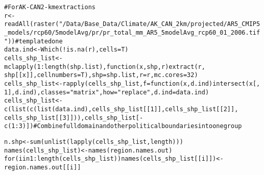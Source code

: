 \documentclass{article}\usepackage[]{graphicx}\usepackage[]{color}
\makeatletter
\newcommand{\hlnum}[1]{\textcolor[rgb]{0.863,0.196,0.184}{#1}}%
\newcommand{\hlstr}[1]{\textcolor[rgb]{0.863,0.196,0.184}{#1}}%
\newcommand{\hlcom}[1]{\textcolor[rgb]{0.345,0.431,0.459}{#1}}%
\newcommand{\hlopt}[1]{\textcolor[rgb]{0.576,0.631,0.631}{#1}}%
\newcommand{\hlstd}[1]{\textcolor[rgb]{0.514,0.58,0.588}{#1}}%
\newcommand{\hlkwa}[1]{\textcolor[rgb]{0.796,0.294,0.086}{#1}}%
\newcommand{\hlkwb}[1]{\textcolor[rgb]{0.522,0.6,0}{#1}}%
\newcommand{\hlkwc}[1]{\textcolor[rgb]{0.796,0.294,0.086}{#1}}%
\newcommand{\hlkwd}[1]{\textcolor[rgb]{0.576,0.631,0.631}{#1}}%
\newenvironment{kframe}{%
 \def\at@end@of@kframe{}%
 \ifinner\ifhmode%
  \def\at@end@of@kframe{\end{minipage}}%
  \begin{minipage}{\columnwidth}%
 \fi\fi%
 \def\FrameCommand##1{\hskip\@totalleftmargin \hskip-\fboxsep
 \colorbox{shadecolor}{##1}\hskip-\fboxsep
     \hskip-\linewidth \hskip-\@totalleftmargin \hskip\columnwidth}%
 \MakeFramed {\advance\hsize-\width
   \@totalleftmargin\z@ \linewidth\hsize
   \@setminipage}}%
 {\par\unskip\endMakeFramed%
 \at@end@of@kframe}
\newenvironment{knitrout}{}{} %
\makeatother
\begin{document}
\begin{knitrout}
\color{fgcolor}\begin{kframe}
\begin{alltt}
\hlcom{# For AK-CAN 2-km extractions}
\hlstd{r} \hlkwb{<-} \hlkwd{readAll}\hlstd{(}\hlkwd{raster}\hlstd{(}\hlstr{"/Data/Base_Data/Climate/AK_CAN_2km/projected/AR5_CMIP5_models/rcp60/5modelAvg/pr/pr_total_mm_AR5_5modelAvg_rcp60_01_2006.tif"}\hlstd{))}  \hlcom{# template done}
\hlstd{data.ind} \hlkwb{<-} \hlkwd{Which}\hlstd{(}\hlopt{!}\hlkwd{is.na}\hlstd{(r),} \hlkwc{cells} \hlstd{= T)}
\hlstd{cells_shp_list} \hlkwb{<-} \hlkwd{mclapply}\hlstd{(}\hlnum{1}\hlopt{:}\hlkwd{length}\hlstd{(shp.list),} \hlkwa{function}\hlstd{(}\hlkwc{x}\hlstd{,} \hlkwc{shp}\hlstd{,} \hlkwc{r}\hlstd{)} \hlkwd{extract}\hlstd{(r,}
    \hlstd{shp[[x]],} \hlkwc{cellnumbers} \hlstd{= T),} \hlkwc{shp} \hlstd{= shp.list,} \hlkwc{r} \hlstd{= r,} \hlkwc{mc.cores} \hlstd{=} \hlnum{32}\hlstd{)}
\hlstd{cells_shp_list} \hlkwb{<-} \hlkwd{rapply}\hlstd{(cells_shp_list,} \hlkwc{f} \hlstd{=} \hlkwa{function}\hlstd{(}\hlkwc{x}\hlstd{,} \hlkwc{d.ind}\hlstd{)} \hlkwd{intersect}\hlstd{(x[,}
    \hlnum{1}\hlstd{], d.ind),} \hlkwc{classes} \hlstd{=} \hlstr{"matrix"}\hlstd{,} \hlkwc{how} \hlstd{=} \hlstr{"replace"}\hlstd{,} \hlkwc{d.ind} \hlstd{= data.ind)}
\hlstd{cells_shp_list} \hlkwb{<-} \hlkwd{c}\hlstd{(}\hlkwd{list}\hlstd{(}\hlkwd{c}\hlstd{(}\hlkwd{list}\hlstd{(data.ind), cells_shp_list[[}\hlnum{1}\hlstd{]], cells_shp_list[[}\hlnum{2}\hlstd{]],}
    \hlstd{cells_shp_list[[}\hlnum{3}\hlstd{]])), cells_shp_list[}\hlopt{-}\hlkwd{c}\hlstd{(}\hlnum{1}\hlopt{:}\hlnum{3}\hlstd{)])}  \hlcom{# Combine full domain and other political boundaries into one group}

\hlstd{n.shp} \hlkwb{<-} \hlkwd{sum}\hlstd{(}\hlkwd{unlist}\hlstd{(}\hlkwd{lapply}\hlstd{(cells_shp_list, length)))}
\hlkwd{names}\hlstd{(cells_shp_list)} \hlkwb{<-} \hlkwd{names}\hlstd{(region.names.out)}
\hlkwa{for} \hlstd{(i} \hlkwa{in} \hlnum{1}\hlopt{:}\hlkwd{length}\hlstd{(cells_shp_list))} \hlkwd{names}\hlstd{(cells_shp_list[[i]])} \hlkwb{<-} \hlstd{region.names.out[[i]]}


\end{alltt}
\end{kframe}
\end{knitrout}
\end{document}
